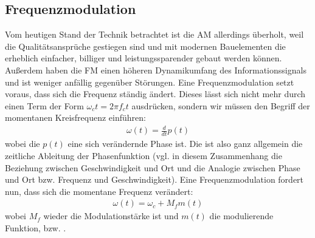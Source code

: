 \documentclass[letterpaper,10pt,english]{jupyterBook}
\begin{document}
\subsection{Frequenzmodulation}
\label{\detokenize{content/3_Modulationen:frequenzmodulation}}
\sphinxAtStartPar
Vom heutigen Stand der Technik betrachtet ist die AM allerdings überholt, weil die Qualitätsansprüche gestiegen sind und mit modernen Bauelementen die  erheblich einfacher, billiger und leistungssparender gebaut werden können. Außerdem haben die FM einen höheren Dynamikumfang des Informationssignals und ist weniger anfällig gegenüber Störungen. Eine Frequenzmodulation setzt voraus, dass sich die Frequenz ständig ändert. Dieses lässt sich nicht mehr durch einen Term der Form \(\omega_c t = 2\pi f_c t\) ausdrücken, sondern wir müssen den Begriff der momentanen Kreisfrequenz einführen:
\begin{equation*}
\begin{split}\omega(t) = \frac{d}{dt}p(t)\end{split}
\end{equation*}
\sphinxAtStartPar
wobei die \(p(t)\) eine sich verändernde Phase ist. Die  ist also ganz allgemein die zeitliche Ableitung der Phasenfunktion (vgl. in diesem Zusammenhang die Beziehung zwischen Geschwindigkeit und Ort und die Analogie zwischen Phase und Ort bzw. Frequenz und Geschwindigkeit). Eine Frequenzmodulation fordert nun, dass sich die momentane Frequenz verändert:
\begin{equation*}
\begin{split}\omega (t)=\omega_c+M_{f} m(t)\end{split}
\end{equation*}
\sphinxAtStartPar
wobei \(M_f\) wieder die Modulationstärke ist und \(m(t)\) die modulierende Funktion, bzw. .
\end{document}
